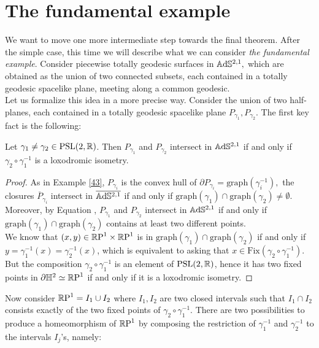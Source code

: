 \section{The fundamental example}\label{fundamentalexamplesec} We want to move one more intermediate step towards the final theorem. After the simple case, this time we will describe what we can consider \textit{the fundamental example}. Consider piecewise totally geodesic surfaces in $\A^{2,1},$ which are obtained as the union of two connected subsets, each contained in a totally geodesic spacelike plane, meeting along a common geodesic. \\
Let us formalize this idea in a more precise way. Consider the union of two half-planes, each contained in a totally geodesic spacelike plane $P_{\gamma_1},P_{\gamma_2}$. The first key fact is the following:

\begin{lemma}\label{Mati}
    Let $\gamma_1\neq\gamma_2\in\PSL$. Then $P_{\gamma_1}$ and $P_{\gamma_2}$ intersect in $\A^{2,1}$ if and only if $\gamma_2\circ{\gamma_1^{-1}}$ is a loxodromic isometry. 
\end{lemma}
\begin{proof}
    As in Example \ref{43}, $P_{\gamma_i}$ is the convex hull of $\partial P_{\gamma_i}=\text{graph}(\gamma_i^{-1}),$ the closures $\overline{P}_{\gamma_i}$  intersect in $\overline{\A^{2,1}}$ if and only if $\text{graph}(\gamma_1)\cap\text{graph}(\gamma_2)\neq\emptyset$. Moreover, by Equation , $P_{\gamma_1}$ and $P_{\gamma_2}$ intersect in $\A^{2,1}$ if and only if $\text{graph}(\gamma_1)\cap\text{graph}(\gamma_2)$ contains at least two different points. \\
    We know that $(x,y)\in\T$ is in $\text{graph}(\gamma_1)\cap\text{graph}(\gamma_2)$ if and only if $y=\gamma_1^{-1}(x)=\gamma_2^{-1}(x)$, which is equivalent to asking that $x\in\text{Fix}(\gamma_2\circ\gamma_1^{-1})$. But the composition $\gamma_2\circ\gamma_1^{-1}$ is an element of $\PSL$, hence it has two fixed points in $\partial\H^2\simeq\S$ if and only if it is a loxodromic isometry.
\end{proof}


Now consider $\S=I_1\cup I_2$ where $I_1,I_2$ are two closed intervals such that $I_1\cap I_2$ consists exactly of the two fixed points of $\gamma_2\circ\gamma_1^{-1}.$ There are two possibilities to produce a homeomorphism of $\S$ by composing the restriction of $\gamma_1^{-1}$ and $\gamma_2^{-1}$ to the intervals $I_j$'s, namely: 

